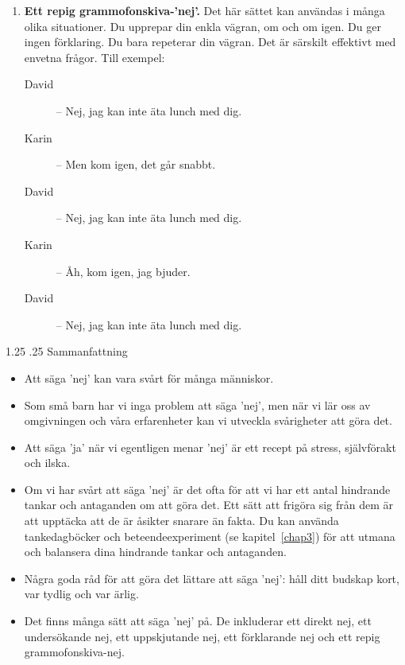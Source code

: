 \documentclass[swedish,a4paper]{book}
\makeatletter
\renewcommand\section{\@startsection{section}{1}{\z@}%
                                   {1.25\baselineskip}%
                                   {.25\baselineskip}%
                                   {\fontsize{1.25\baselineskip}{1.25\baselineskip}\selectfont\sffamily\bfseries}} %
\makeatother
\begin{document}
\begin{enumerate}
\item \textbf{Ett repig grammofonskiva-'nej'.} Det här sättet kan användas i många olika situationer. Du upprepar din enkla vägran, om och om igen. Du ger ingen förklaring. Du bara repeterar din vägran. Det är särskilt effektivt med envetna frågor. %
Till exempel: 

\begin{description}

\item[David] -- Nej, jag kan inte äta lunch med dig.

\item[Karin] -- Men kom igen, det går snabbt.

\item[David] -- Nej, jag kan inte äta lunch med dig.

\item[Karin] -- Åh, kom igen, jag bjuder.

\item[David] -- Nej, jag kan inte äta lunch med dig.

\end{description}

\end{enumerate}

\section{Sammanfattning}

\begin{itemize}

\item Att säga 'nej' kan vara svårt för många människor.

\item Som små barn har vi inga problem att säga 'nej', men när vi lär oss av omgivningen och våra erfarenheter kan vi utveckla svårigheter att göra det.

\item Att säga 'ja' när vi egentligen menar 'nej' är ett recept på stress, självförakt och ilska.

\item Om vi har svårt att säga 'nej' är det ofta för att vi har ett antal hindrande tankar och antaganden om att göra det. Ett sätt att frigöra sig från dem är att upptäcka att de är åsikter snarare än fakta. Du kan använda tankedagböcker och beteendeexperiment (se kapitel~\ref{chap3}) för att utmana och balansera dina hindrande tankar och antaganden.

\item Några goda råd för att göra det lättare att säga 'nej': håll ditt budskap kort, var tydlig och var ärlig.

\item Det finns många sätt att säga 'nej' på. De inkluderar ett direkt nej, ett undersökande nej, ett uppskjutande nej, ett förklarande nej och ett repig grammofonskiva-nej.

\end{itemize}
\end{document}
